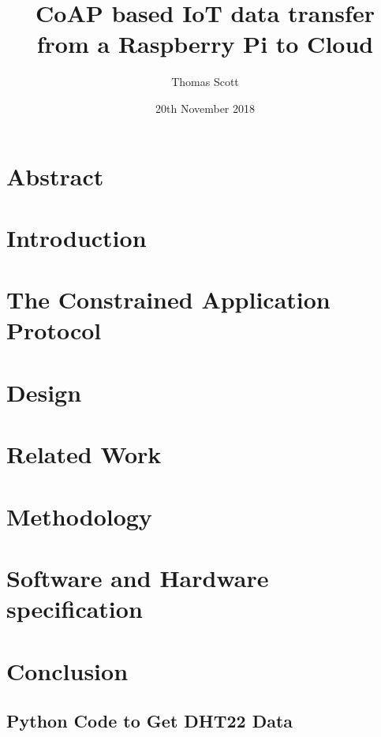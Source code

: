 \documentclass[11pt]{article}
\title{CoAP based IoT data transfer from a Raspberry Pi to Cloud}
\author{Thomas Scott}
\date{20th November 2018}
\begin{document}
	\maketitle
	\newpage

	\section{Abstract}
	

	\section{Introduction}
	

	\section{The Constrained Application Protocol}
	

	\section{Design}
	

	\section{Related Work}
	

	\section{Methodology}
	

	\section{Software and Hardware specification}
	

	\section{Conclusion}
	

	\newpage
	\begin{appendices}
		
		\section{Python Code to Get DHT22 Data}
		
		
	\end{appendices}

	\newpage
	\printglossaries

	\newpage
	
	
\end{document}
